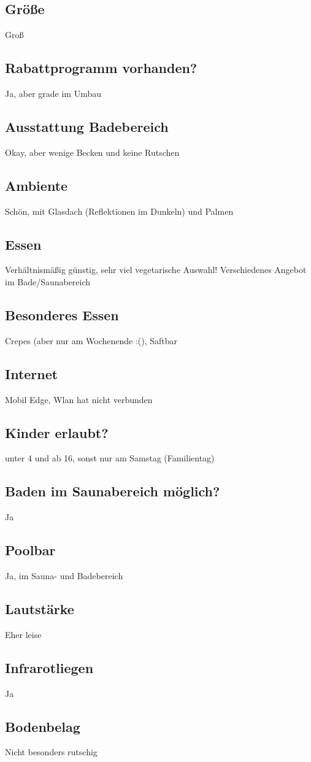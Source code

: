 \documentclass{article}
\begin{document}
\subsection*{Größe} Groß
\subsection*{Rabattprogramm vorhanden?} Ja, aber grade im Umbau 
\subsection*{Ausstattung Badebereich} Okay, aber wenige Becken und keine Rutschen
\subsection*{Ambiente} Schön, mit Glasdach (Reflektionen im Dunkeln) und Palmen
\subsection*{Essen} Verhältnismäßig günstig, sehr viel vegetarische Auswahl! Verschiedenes Angebot im Bade/Saunabereich
\subsection*{Besonderes Essen} Crepes (aber nur am Wochenende :(), Saftbar
\subsection*{Internet} Mobil Edge, Wlan hat nicht verbunden
\subsection*{Kinder erlaubt?} unter 4 und ab 16, sonst nur am Samstag (Familientag)
\subsection*{Baden im Saunabereich möglich?} Ja
\subsection*{Poolbar} Ja, im Sauna- und Badebereich
\subsection*{Lautstärke} Eher leise
\subsection*{Infrarotliegen} Ja
\subsection*{Bodenbelag} Nicht besonders rutschig
\pagebreak
\end{document}
